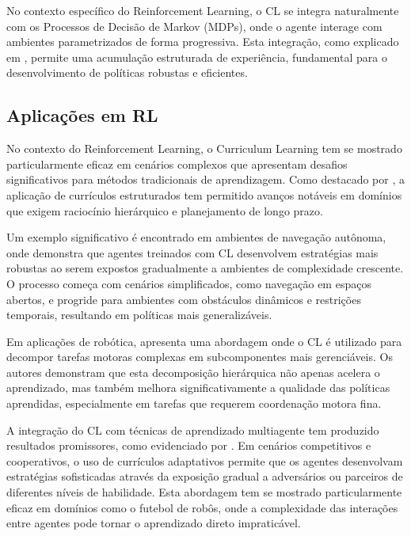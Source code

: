 No contexto específico do Reinforcement Learning, o CL se integra naturalmente com os Processos de Decisão de Markov (MDPs), onde o agente interage com ambientes parametrizados de forma progressiva. Esta integração, como explicado em \cite{https://repositories.lib.utexas.edu/items/d6530e2e-35e5-452e-972c-8b3bb1dea93b}, permite uma acumulação estruturada de experiência, fundamental para o desenvolvimento de políticas robustas e eficientes.

\subsection{Aplicações em RL}
\label{subsec:curriculum_rl}

No contexto do Reinforcement Learning, o Curriculum Learning tem se mostrado particularmente eficaz em cenários complexos que apresentam desafios significativos para métodos tradicionais de aprendizagem. Como destacado por \cite{https://lilianweng.github.io/posts/2020-01-29-curriculum-rl/}, a aplicação de currículos estruturados tem permitido avanços notáveis em domínios que exigem raciocínio hierárquico e planejamento de longo prazo.

Um exemplo significativo é encontrado em ambientes de navegação autônoma, onde \cite{https://huggingface.co/learn/deep-rl-course/unitbonus3/curriculum-learning} demonstra que agentes treinados com CL desenvolvem estratégias mais robustas ao serem expostos gradualmente a ambientes de complexidade crescente. O processo começa com cenários simplificados, como navegação em espaços abertos, e progride para ambientes com obstáculos dinâmicos e restrições temporais, resultando em políticas mais generalizáveis.

Em aplicações de robótica, \cite{https://arxiv.org/abs/2003.04960} apresenta uma abordagem onde o CL é utilizado para decompor tarefas motoras complexas em subcomponentes mais gerenciáveis. Os autores demonstram que esta decomposição hierárquica não apenas acelera o aprendizado, mas também melhora significativamente a qualidade das políticas aprendidas, especialmente em tarefas que requerem coordenação motora fina.

A integração do CL com técnicas de aprendizado multiagente tem produzido resultados promissores, como evidenciado por \cite{https://www.ijcai.org/proceedings/2017/757}. Em cenários competitivos e cooperativos, o uso de currículos adaptativos permite que os agentes desenvolvam estratégias sofisticadas através da exposição gradual a adversários ou parceiros de diferentes níveis de habilidade. Esta abordagem tem se mostrado particularmente eficaz em domínios como o futebol de robôs, onde a complexidade das interações entre agentes pode tornar o aprendizado direto impraticável.

